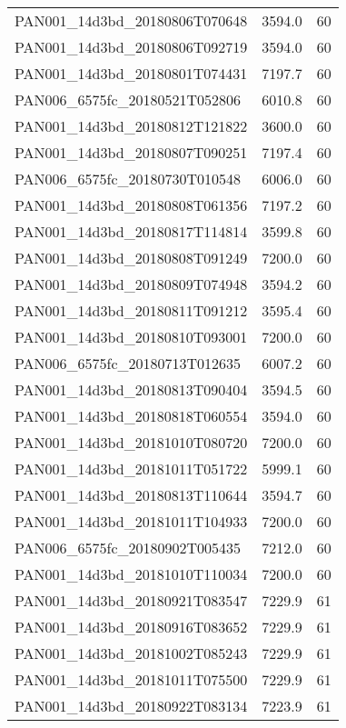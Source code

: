 \begin{tabular}{lrr}
PAN001\_14d3bd\_20180806T070648 &     3594.0 &       60 \\
PAN001\_14d3bd\_20180806T092719 &     3594.0 &       60 \\
PAN001\_14d3bd\_20180801T074431 &     7197.7 &       60 \\
PAN006\_6575fc\_20180521T052806 &     6010.8 &       60 \\
PAN001\_14d3bd\_20180812T121822 &     3600.0 &       60 \\
PAN001\_14d3bd\_20180807T090251 &     7197.4 &       60 \\
PAN006\_6575fc\_20180730T010548 &     6006.0 &       60 \\
PAN001\_14d3bd\_20180808T061356 &     7197.2 &       60 \\
PAN001\_14d3bd\_20180817T114814 &     3599.8 &       60 \\
PAN001\_14d3bd\_20180808T091249 &     7200.0 &       60 \\
PAN001\_14d3bd\_20180809T074948 &     3594.2 &       60 \\
PAN001\_14d3bd\_20180811T091212 &     3595.4 &       60 \\
PAN001\_14d3bd\_20180810T093001 &     7200.0 &       60 \\
PAN006\_6575fc\_20180713T012635 &     6007.2 &       60 \\
PAN001\_14d3bd\_20180813T090404 &     3594.5 &       60 \\
PAN001\_14d3bd\_20180818T060554 &     3594.0 &       60 \\
PAN001\_14d3bd\_20181010T080720 &     7200.0 &       60 \\
PAN001\_14d3bd\_20181011T051722 &     5999.1 &       60 \\
PAN001\_14d3bd\_20180813T110644 &     3594.7 &       60 \\
PAN001\_14d3bd\_20181011T104933 &     7200.0 &       60 \\
PAN006\_6575fc\_20180902T005435 &     7212.0 &       60 \\
PAN001\_14d3bd\_20181010T110034 &     7200.0 &       60 \\
PAN001\_14d3bd\_20180921T083547 &     7229.9 &       61 \\
PAN001\_14d3bd\_20180916T083652 &     7229.9 &       61 \\
PAN001\_14d3bd\_20181002T085243 &     7229.9 &       61 \\
PAN001\_14d3bd\_20181011T075500 &     7229.9 &       61 \\
PAN001\_14d3bd\_20180922T083134 &     7223.9 &       61 \\

\end{tabular}
